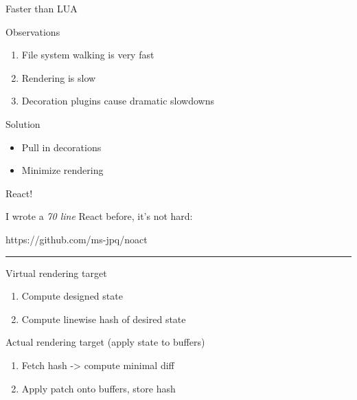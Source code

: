 \documentclass{beamer}
\begin{document}
\begin{frame}{Faster than LUA}

	\begin{block}{Observations}

		\begin{enumerate}

			\item File system walking is very fast

			\item Rendering is slow

			\item Decoration plugins cause dramatic slowdowns

		\end{enumerate}

	\end{block}

	\hspace{0.1em}

	\begin{block}{Solution}

		\begin{itemize}

			\item Pull in decorations

			\item Minimize rendering

		\end{itemize}

	\end{block}

\end{frame}


\begin{frame}{React!}

	I wrote a \textit{70 line} React before, it's not hard:

	https://github.com/ms-jpq/noact

	\rule{\textwidth}{0.1em}

	Virtual rendering target

	\begin{enumerate}

		\item Compute designed state

		\item Compute linewise hash of desired state

	\end{enumerate}

	Actual rendering target (apply state to buffers)

	\begin{enumerate}

		\item Fetch hash -> compute minimal diff

		\item Apply patch onto buffers, store hash

	\end{enumerate}

\end{frame}
\end{document}
